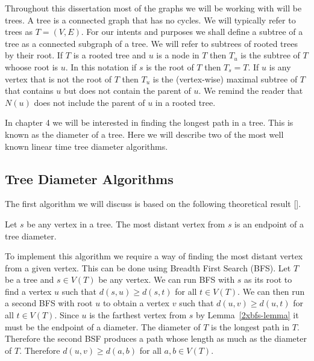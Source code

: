 Throughout this dissertation most of the graphs we will be working with will be trees. A tree is a connected graph that has no cycles. We will typically refer to trees as $T = (V, E)$. For our intents and purposes we shall define a subtree of a tree as a connected subgraph of a tree. We will refer to subtrees of rooted trees by their root. If $T$ is a rooted tree and $u$ is a node in $T$ then $T_u$ is the subtree of $T$ whoose root is $u$. In this notation if $s$ is the root of $T$ then $T_s = T$. If $u$ is any vertex that is not the root of $T$ then $T_u$ is the (vertex-wise) maximal subtree of $T$ that contains $u$ but does not contain the parent of $u$. We remind the reader that $N(u)$ does not include the parent of $u$ in a rooted tree.


In chapter 4 we will be interested in finding the longest path in a tree. This is known as the diameter of a tree. Here we will  describe two of the most well known linear time tree diameter algorithms.

\subsection{Tree Diameter Algorithms}

The first algorithm we will discuss is based on the following theoretical result [].

\begin{lem} \label{2xbfs-lemma} Let $s$ be any vertex in a tree. The most distant vertex from $s$ is an endpoint of a tree diameter. \end{lem}

To implement this algorithm we require a way of finding the most distant vertex from a given vertex. This can be done using Breadth First Search (BFS). Let $T$ be a tree and $s \in V(T)$ be any vertex. We can run BFS with $s$ as its root to find a vertex $u$ such that $d(s, u) \ge d(s, t)$ for all $t \in V(T)$. We can then run a second BFS with root $u$ to obtain a vertex $v$ such that $d(u, v) \ge d(u, t)$ for all $t \in V(T)$. Since $u$ is the farthest vertex from $s$ by Lemma~\ref{2xbfs-lemma} it must be the endpoint of a diameter. The diameter of $T$ is the longest path in $T$. Therefore the second BSF produces a path whose length as much as the diameter of $T$. Therefore $d(u, v) \ge d(a, b)$ for all $a,b \in V(T)$.

